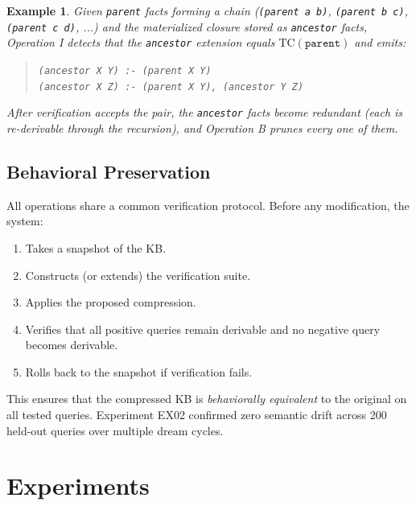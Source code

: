 \documentclass[10pt,conference]{IEEEtran}
\newtheorem{example}[theorem]{Example}
\begin{document}
\begin{example}
Given \texttt{parent} facts forming a chain (\texttt{(parent a b)}, \texttt{(parent b c)}, \texttt{(parent c d)}, ...) and the materialized closure stored as \texttt{ancestor} facts, Operation I detects that the \texttt{ancestor} extension equals $\mathrm{TC}(\texttt{parent})$ and emits:
\begin{quote}
\texttt{(ancestor X Y) :- (parent X Y)}\\
\texttt{(ancestor X Z) :- (parent X Y), (ancestor Y Z)}
\end{quote}
After verification accepts the pair, the \texttt{ancestor} facts become redundant (each is re-derivable through the recursion), and Operation B prunes every one of them.
\end{example}

\subsection{Behavioral Preservation}

All operations share a common verification protocol. Before any modification, the system:
\begin{enumerate}
\item Takes a snapshot of the KB.
\item Constructs (or extends) the verification suite.
\item Applies the proposed compression.
\item Verifies that all positive queries remain derivable and no negative query becomes derivable.
\item Rolls back to the snapshot if verification fails.
\end{enumerate}

This ensures that the compressed KB is \emph{behaviorally equivalent} to the original on all tested queries. Experiment EX02 confirmed zero semantic drift across 200 held-out queries over multiple dream cycles.


\section{Experiments}
\label{sec:experiments}
\end{document}
